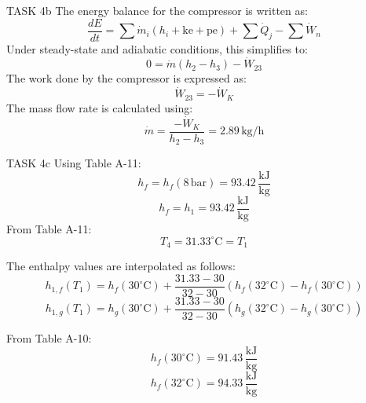 TASK 4b  
The energy balance for the compressor is written as:  
\[
\frac{dE}{dt} = \sum \dot{m}_i \left( h_i + \text{ke} + \text{pe} \right) + \sum \dot{Q}_j - \sum \dot{W}_n
\]  
Under steady-state and adiabatic conditions, this simplifies to:  
\[
0 = \dot{m} \left( h_2 - h_3 \right) - \dot{W}_{23}
\]  
The work done by the compressor is expressed as:  
\[
\dot{W}_{23} = -\dot{W}_K
\]  
The mass flow rate is calculated using:  
\[
\dot{m} = \frac{-\dot{W}_K}{h_2 - h_3} = 2.89 \, \text{kg/h}
\]  

TASK 4c  
Using Table A-11:  
\[
h_f = h_f(8 \, \text{bar}) = 93.42 \, \frac{\text{kJ}}{\text{kg}}
\]  
\[
h_f = h_1 = 93.42 \, \frac{\text{kJ}}{\text{kg}}
\]  
From Table A-11:  
\[
T_4 = 31.33^\circ\text{C} = T_1
\]  

The enthalpy values are interpolated as follows:  
\[
h_{1,f}(T_1) = h_f(30^\circ\text{C}) + \frac{31.33 - 30}{32 - 30} \left( h_f(32^\circ\text{C}) - h_f(30^\circ\text{C}) \right)
\]  
\[
h_{1,g}(T_1) = h_g(30^\circ\text{C}) + \frac{31.33 - 30}{32 - 30} \left( h_g(32^\circ\text{C}) - h_g(30^\circ\text{C}) \right)
\]  

From Table A-10:  
\[
h_f(30^\circ\text{C}) = 91.43 \, \frac{\text{kJ}}{\text{kg}}
\]  
\[
h_f(32^\circ\text{C}) = 94.33 \, \frac{\text{kJ}}{\text{kg}}
\]